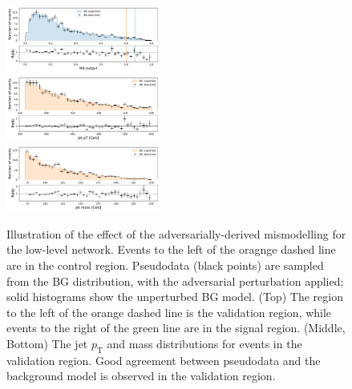 \documentclass[reprint,nofootinbib,...]{revtex4-1}
\newcommand{\pt}{p_\mathrm{T}} %
\begin{document}
\begin{figure}[h!]
\centering
\includegraphics[width=0.45\textwidth]{figures/pseudodata_NN_PFN.pdf} \\
\includegraphics[width=0.45\textwidth]{figures/pseudodata_pt_PFN.pdf} \\
\includegraphics[width=0.45\textwidth]{figures/pseudodata_mass_PFN.pdf} 
\caption{Illustration of the effect of the adversarially-derived mismodelling for the low-level network.
Events to the left of the oragnge dashed line are in the control region.
Pseudodata (black points) are sampled from the BG distribution, with the adversarial perturbation applied; solid histograms show the unperturbed BG model.
(Top) The region to the left of the orange dashed line is the validation region, while events to the right of the green line are in the signal region.
(Middle, Bottom) The jet $\pt$ and mass distributions for events in the validation region.
Good agreement between pseudodata and the background model is observed in the validation region.
}
\label{fig:method2}
\end{figure}


\end{document}

